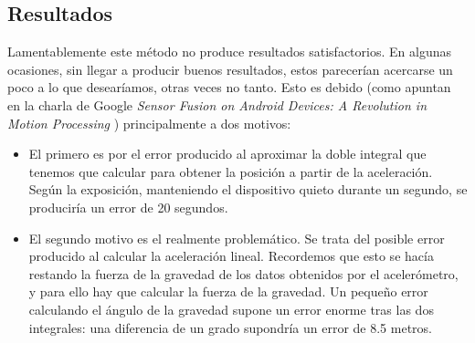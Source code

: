 \documentclass[a4paper,openright, 12pt]{book}
\begin{document}
\subsection{Resultados}
Lamentablemente este método no produce resultados satisfactorios. En algunas ocasiones, sin llegar a producir buenos resultados, estos parecerían acercarse un poco a lo que desearíamos, otras veces no tanto. Esto es debido  (como apuntan en la charla de Google \textit{Sensor Fusion on Android Devices: A Revolution in Motion Processing} \cite{googlesensor}) principalmente a dos motivos:
\begin{itemize}
\item El primero es por el error producido al aproximar la doble integral que tenemos que calcular para obtener la posición a partir de la aceleración. Según la exposición, manteniendo el dispositivo quieto durante un segundo, se produciría un error de 20 segundos.
\item El segundo motivo es el realmente problemático. Se trata del posible error producido al calcular la aceleración lineal. Recordemos que esto se hacía restando la fuerza de la gravedad de los datos obtenidos por el acelerómetro, y para ello hay que calcular la fuerza de la gravedad. Un pequeño error calculando el ángulo de la gravedad supone un error enorme tras las dos integrales: una diferencia de un grado supondría un error de 8.5 metros.
\end{itemize}
\end{document}

